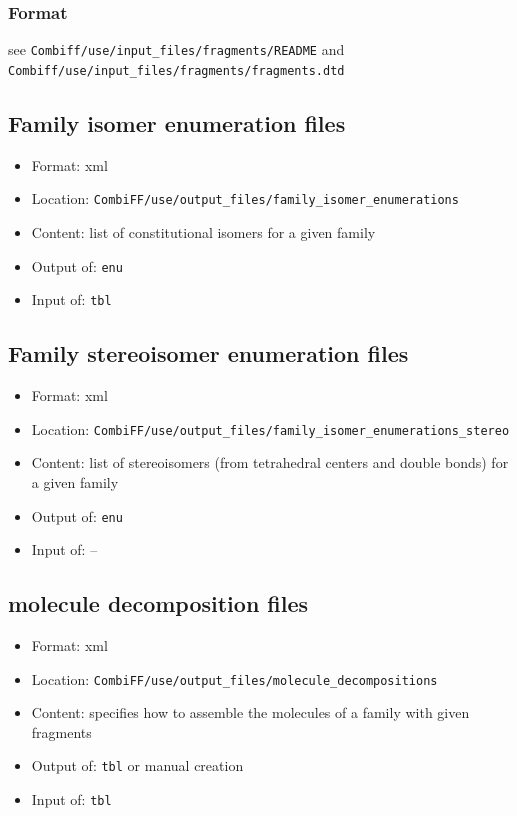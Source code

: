 \documentclass[a4paper,11pt]{article}
\begin{document}
\subsubsection{Format}
see \texttt{Combiff/use/input\_files/fragments/README} and \texttt{Combiff/use/input\_files/fragments/fragments.dtd}

\subsection{Family isomer enumeration files}
\label{filetype_fie}

\begin{itemize}
\item Format: xml
\item Location: \texttt{CombiFF/use/output\_files/family\_isomer\_enumerations}
\item Content: list of constitutional isomers for a given family
\item Output of: \texttt{enu}
\item Input of: \texttt{tbl}
\end{itemize}


\subsection{Family stereoisomer enumeration files}
\label{filetype_fis}
\begin{itemize}
\item Format: xml
\item Location: \texttt{CombiFF/use/output\_files/family\_isomer\_enumerations\_stereo}
\item Content: list of stereoisomers (from tetrahedral centers and double bonds) for a given family
\item Output of: \texttt{enu}
\item Input of: --
\end{itemize}
%

\subsection{molecule decomposition files}
\label{filetype_fis}
\begin{itemize}
\item Format: xml
\item Location: \texttt{CombiFF/use/output\_files/molecule\_decompositions}
\item Content: specifies how to assemble the molecules of a family with given fragments
\item Output of: \texttt{tbl} or manual creation
\item Input of: \texttt{tbl}
\end{itemize}
%
\end{document}

